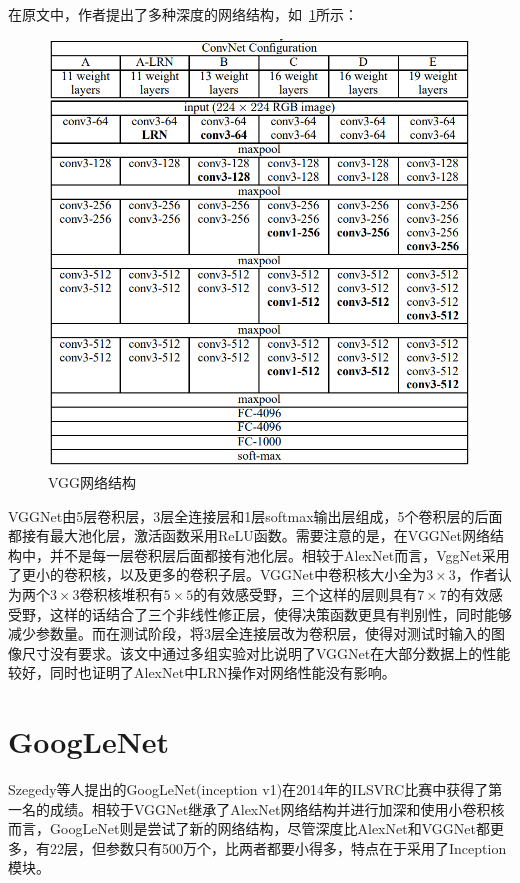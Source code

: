 在原文中，作者提出了多种深度的网络结构，如~\ref{fig:VGGNet_net}所示：
\begin{figure}[h!]
	\centering
	\includegraphics[width=\linewidth]{readings_figures/VGGNet_net.png}
	\caption{VGG网络结构}
	\label{fig:VGGNet_net}
\end{figure}

VGGNet由5层卷积层，3层全连接层和1层softmax输出层组成，5个卷积层的后面都接有最大池化层，激活函数采用ReLU函数。需要注意的是，在VGGNet网络结构中，并不是每一层卷积层后面都接有池化层。相较于AlexNet而言，VggNet采用了更小的卷积核，以及更多的卷积子层。VGGNet中卷积核大小全为$3\times3$，作者认为两个$3\times3$卷积核堆积有$5\times5$的有效感受野，三个这样的层则具有$7\times7$的有效感受野，这样的话结合了三个非线性修正层，使得决策函数更具有判别性，同时能够减少参数量。而在测试阶段，将3层全连接层改为卷积层，使得对测试时输入的图像尺寸没有要求。该文中通过多组实验对比说明了VGGNet在大部分数据上的性能较好，同时也证明了AlexNet中LRN操作对网络性能没有影响。


\section{GoogLeNet}

Szegedy等人\cite{szegedy2015going}提出的GoogLeNet(inception v1)在2014年的ILSVRC比赛中获得了第一名的成绩。相较于VGGNet继承了AlexNet网络结构并进行加深和使用小卷积核而言，GoogLeNet则是尝试了新的网络结构，尽管深度比AlexNet和VGGNet都更多，有22层，但参数只有500万个，比两者都要小得多，特点在于采用了Inception模块。


